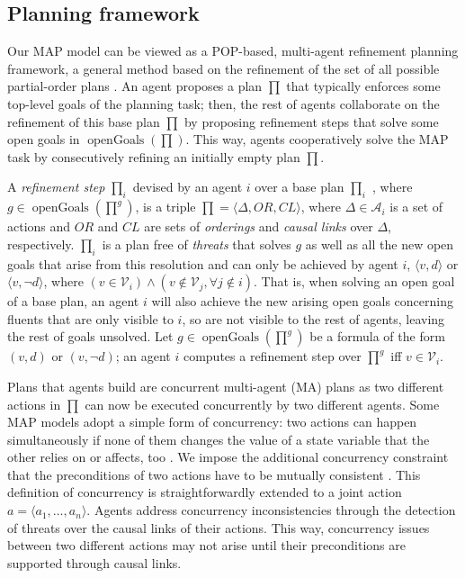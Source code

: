 \documentclass[12pt]{article}
\DeclareMathOperator{\openGoals}{openGoals}
\begin{document}
\subsection{Planning framework}

Our MAP model can be viewed as a POP-based, multi-agent refinement planning framework, a general method based on the refinement of the set of all possible partial-order plans \cite{Kambhampati_1997}.
An agent proposes a plan $\prod$ that typically enforces some top-level goals of the planning task; then, the rest of agents collaborate on the refinement of this base plan $\prod$ by proposing refinement steps that solve some open goals in $\openGoals(\prod)$.
This way, agents cooperatively solve the MAP task by consecutively refining an initially empty plan $\prod$.

A \textit{refinement step} $\prod_i$ devised by an agent $i$ over a base plan $\prod_i$ , where $g \in \openGoals(\prod^g)$, is a triple $\prod = \langle \Delta, OR, CL\rangle$, where $\Delta \in \mathcal{A}_i$ is a set of actions and $OR$ and $CL$ are sets of \textit{orderings} and \textit{causal links} over $\Delta$, respectively.
$\prod_i$ is a plan free of \textit{threats} \cite{Younes2003VHPOPVH} that solves $g$ as well as all the new open goals that arise from this resolution and can only be achieved by agent $i$, $\langle v, d\rangle$ or $\langle v, \neg d\rangle$, where $(v \in \mathcal{V}_i) \wedge (v \notin \mathcal{V}_j, \forall j \notin i)$.
That is, when solving an open goal of a base plan, an agent $i$ will also achieve the new arising open goals concerning fluents that are only visible to $i$, so are not visible to the rest of agents, leaving the rest of goals unsolved.
Let $g \in \openGoals(\prod^g)$ be a formula of the form $(v, d)$ or $(v, ¬d)$; an agent $i$ computes a refinement step over $\prod^g$ iff $v \in \mathcal{V}_i$.

Plans that agents build are concurrent multi-agent (MA) plans as two different actions in $\prod$ can now be executed concurrently by two different agents.
Some MAP models adopt a simple form of concurrency: two actions can happen simultaneously if none of them changes the value of a state variable that the other relies on or affects, too \cite{Brenner2009}.
We impose the additional concurrency constraint that the preconditions of two actions have to be mutually consistent \cite{Boutilier_2001}.
This definition of concurrency is straightforwardly extended to a joint action $a = \langle a_1,\ldots, a_n\rangle$.
Agents address concurrency inconsistencies through the detection of threats over the causal links of their actions.
This way, concurrency issues between two different actions may not arise until their preconditions are supported through causal links.
\end{document}
